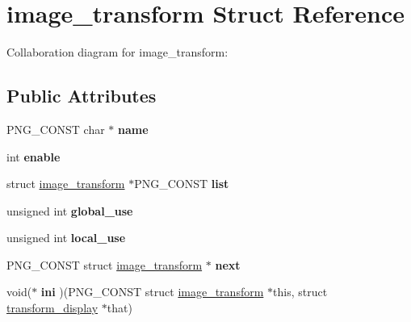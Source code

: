 \hypertarget{structimage__transform}{\section{image\+\_\+transform Struct Reference}
\label{structimage__transform}
}


Collaboration diagram for image\+\_\+transform\+:
\subsection*{Public Attributes}
\begin{DoxyCompactItemize}
\item 
\hypertarget{structimage__transform_a4aa842229aa599764c85814c93e5af66}{P\+N\+G\+\_\+\+C\+O\+N\+S\+T char $\ast$ {\bfseries name}}\label{structimage__transform_a4aa842229aa599764c85814c93e5af66}

\item 
\hypertarget{structimage__transform_ae236f58e4fcb0bc66e5bb424b8bfd54d}{int {\bfseries enable}}\label{structimage__transform_ae236f58e4fcb0bc66e5bb424b8bfd54d}

\item 
\hypertarget{structimage__transform_a63df4cb9a88001fb19e34a68e438b94f}{struct \hyperlink{structimage__transform}{image\+\_\+transform} $\ast$P\+N\+G\+\_\+\+C\+O\+N\+S\+T {\bfseries list}}\label{structimage__transform_a63df4cb9a88001fb19e34a68e438b94f}

\item 
\hypertarget{structimage__transform_aa11a983bb98026c223ea2446b71e31bb}{unsigned int {\bfseries global\+\_\+use}}\label{structimage__transform_aa11a983bb98026c223ea2446b71e31bb}

\item 
\hypertarget{structimage__transform_a00016238d3c31a9e2c0b36c3ccd84a4d}{unsigned int {\bfseries local\+\_\+use}}\label{structimage__transform_a00016238d3c31a9e2c0b36c3ccd84a4d}

\item 
\hypertarget{structimage__transform_a0451c7414d6d396f24043f502fc7ceef}{P\+N\+G\+\_\+\+C\+O\+N\+S\+T struct \hyperlink{structimage__transform}{image\+\_\+transform} $\ast$ {\bfseries next}}\label{structimage__transform_a0451c7414d6d396f24043f502fc7ceef}

\item 
\hypertarget{structimage__transform_ae20ccc8a65e5e9def9e230d463cdf207}{void($\ast$ {\bfseries ini} )(P\+N\+G\+\_\+\+C\+O\+N\+S\+T struct \hyperlink{structimage__transform}{image\+\_\+transform} $\ast$this, struct \hyperlink{structtransform__display}{transform\+\_\+display} $\ast$that)}\label{structimage__transform_ae20ccc8a65e5e9def9e230d463cdf207}


\end{DoxyCompactItemize}

